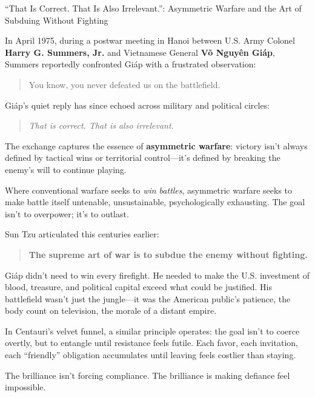 \medskip

\begin{HistoricalSidebar}{“That Is Correct. That Is Also Irrelevant.”: Asymmetric Warfare and the Art of Subduing Without Fighting}

  In April 1975, during a postwar meeting in Hanoi between U.S. Army Colonel \textbf{Harry G. Summers, Jr.} and Vietnamese General \textbf{Võ Nguyên Giáp}, Summers reportedly confronted Giáp with a frustrated observation:
  
  \begin{quote}
  You know, you never defeated us on the battlefield.
  \end{quote}
  
  Giáp’s quiet reply has since echoed across military and political circles:
  
  \begin{quote}
  \textit{That is correct. That is also irrelevant.}
  \end{quote}
  
  The exchange captures the essence of \textbf{asymmetric warfare}: victory isn’t always defined by tactical wins or territorial control—it’s defined by breaking the enemy’s will to continue playing.

  \medskip
  
  Where conventional warfare seeks to \textit{win battles}, asymmetric warfare seeks to make battle itself untenable, unsustainable, psychologically exhausting. The goal isn’t to overpower; it’s to outlast.

  \medskip
  
  Sun Tzu articulated this centuries earlier:
  
  \begin{quote}
  \textbf{The supreme art of war is to subdue the enemy without fighting.}
  \end{quote}
  
  Giáp didn’t need to win every firefight. He needed to make the U.S. investment of blood, treasure, and political capital exceed what could be justified. His battlefield wasn’t just the jungle—it was the American public’s patience, the body count on television, the morale of a distant empire.

  \medskip
  
  In Centauri’s velvet funnel, a similar principle operates: the goal isn’t to coerce overtly, but to entangle until resistance feels futile. Each favor, each invitation, each “friendly” obligation accumulates until leaving feels costlier than staying.
  
  \medskip

  
  The brilliance isn’t forcing compliance.  The brilliance is making defiance feel impossible.
  
\end{HistoricalSidebar}

